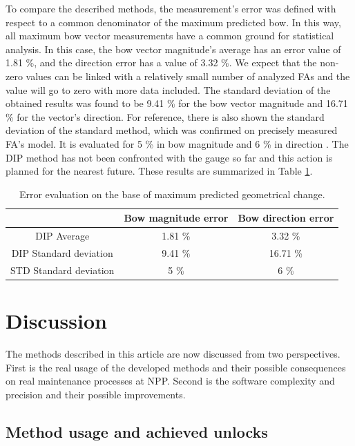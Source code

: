 \documentclass[preprint,12pt]{elsarticle}
\begin{document}
To compare the described methods, the measurement's error was defined with respect to a common denominator of the maximum predicted bow. In this way, all maximum bow vector measurements have a common ground for statistical analysis. In this case, the bow vector magnitude's average has an error value of 1.81 \%, and the direction error has a value of 3.32 \%. We expect that the non-zero values can be linked with a relatively small number of analyzed \ac{FA}s  and the value will go to zero with more data included. The standard deviation of the obtained results was found to be 9.41 \% for the bow vector magnitude and 16.71 \% for the vector's direction. For reference, there is also shown the standard deviation of the standard method, which was confirmed on precisely measured \ac{FA}'s model. It is evaluated for 5 \% in bow magnitude and 6 \% in direction \cite{Mala2015}. The \ac{DIP} method has not been confronted with the gauge so far and this action is planned for the nearest future.  These results are summarized in Table \ref{tabule2}. 

\begin{table}
\begin{tabular}{|c|c|c|}
\hline
                   & Bow magnitude error & Bow direction error \\ \hline
DIP Average            & 1.81 \%             & 3.32 \%             \\ \hline
DIP Standard deviation & 9.41 \%             & 16.71 \%            \\  \hline 
STD Standard deviation & 5 \%             & 6 \%            \\ 
\hline
\end{tabular}
\caption{Error evaluation on the base of maximum predicted geometrical change.}
\label{tabule2}
\end{table}


\section{Discussion}

The methods described in this article are now discussed from two perspectives. First is the real usage of the developed methods and their possible consequences on real maintenance processes at \ac{NPP}. Second is the software complexity and precision and their possible improvements.

\subsection{Method usage and achieved unlocks}
\end{document}
